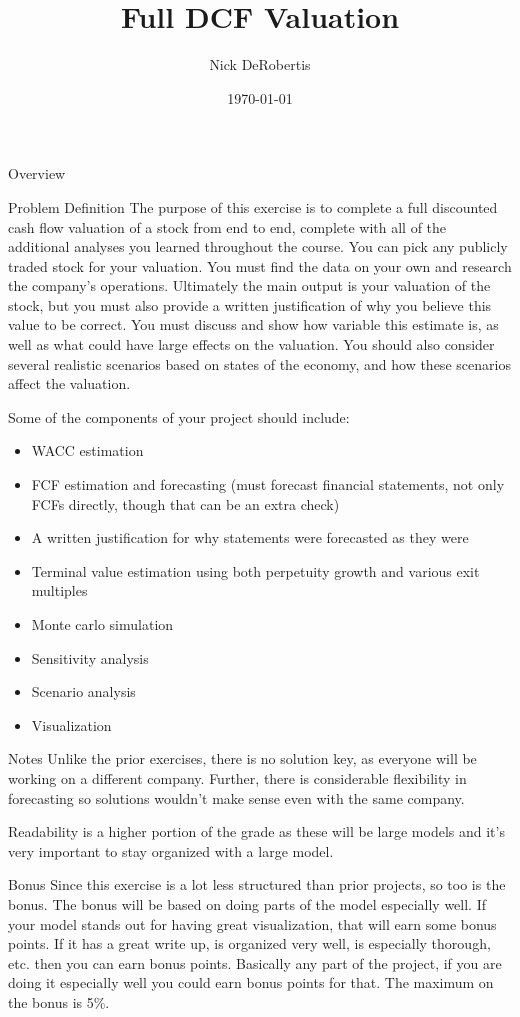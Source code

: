 \documentclass[]{article}
\begin{document}
\title{Full DCF Valuation}
\author{Nick DeRobertis}
\date{\today}
\maketitle
\begin{section}{Overview}
\begin{subsection}{Problem Definition}
The purpose of this exercise is to complete a full discounted cash flow valuation of a stock from end to end,
complete with all of the additional analyses you learned throughout the course. You can pick any publicly traded
stock for your valuation. You must find the data on your own and research the company's operations. Ultimately the
main output is your valuation of the stock, but you must also provide a written justification of why you
believe this value to be correct. You must discuss and show how variable this estimate is, as well as what could
have large effects on the valuation. You should also consider several realistic scenarios based on states of the
economy, and how these scenarios affect the valuation.

Some of the components of your project should include: \begin{itemize}
\item WACC estimation
\item FCF estimation and forecasting (must forecast financial statements, not only FCFs directly, though that can be an extra check)
\item A written justification for why statements were forecasted as they were
\item Terminal value estimation using both perpetuity growth and various exit multiples
\item Monte carlo simulation
\item Sensitivity analysis
\item Scenario analysis
\item Visualization
\end{itemize}

\end{subsection}
\begin{subsection}{Notes}
Unlike the prior exercises, there is no solution key, as everyone will be working on a different company. Further,
there is considerable flexibility in forecasting so solutions wouldn't make sense even with the same company.

Readability is a higher portion of the grade as these will be large models and it's very important to stay
organized with a large model.
\end{subsection}
\begin{subsection}{Bonus}
Since this exercise is a lot less structured than prior projects, so too is the bonus. The bonus will be based on
doing parts of the model especially well. If your model stands out for having great visualization, that will earn
some bonus points. If it has a great write up, is organized very well, is especially thorough, etc. then you
can earn bonus points. Basically any part of the project, if you are doing it especially well you could earn
bonus points for that. The maximum on the bonus is 5\%.
\end{subsection}
\end{section}
\end{document}
